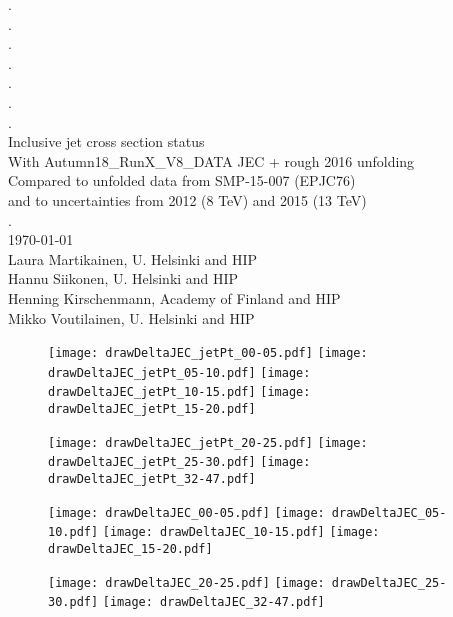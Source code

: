 \documentclass[landscape,10pt]{beamer} %
\begin{document}
\begin{centering}
{. }\\
{. }\\
{. }\\
{. }\\
{. }\\
{. }\\
{. }\\
Inclusive jet cross section status\\
With Autumn18\_RunX\_V8\_DATA JEC + rough 2016 unfolding\\
Compared to unfolded data from SMP-15-007 (EPJC76)\\
and to uncertainties from 2012 (8 TeV) and 2015 (13 TeV)\\
{. }\\
\today\\
Laura Martikainen, U. Helsinki and HIP\\
Hannu Siikonen, U. Helsinki and HIP\\
Henning Kirschenmann, Academy of Finland and HIP\\
Mikko Voutilainen, U. Helsinki and HIP\\
\end{centering}

\newpage

\begin{figure}[p]
\centering
  \texttt{[image: drawDeltaJEC\_jetPt\_00-05.pdf]}
  \texttt{[image: drawDeltaJEC\_jetPt\_05-10.pdf]}
  \texttt{[image: drawDeltaJEC\_jetPt\_10-15.pdf]}
  \texttt{[image: drawDeltaJEC\_jetPt\_15-20.pdf]}
\end{figure}
\begin{figure}[p]
\centering
  \texttt{[image: drawDeltaJEC\_jetPt\_20-25.pdf]}
  \texttt{[image: drawDeltaJEC\_jetPt\_25-30.pdf]}
  \texttt{[image: drawDeltaJEC\_jetPt\_32-47.pdf]}
\end{figure}

\newpage

\begin{figure}[p]
\centering
  \texttt{[image: drawDeltaJEC\_00-05.pdf]}
  \texttt{[image: drawDeltaJEC\_05-10.pdf]}
  \texttt{[image: drawDeltaJEC\_10-15.pdf]}
  \texttt{[image: drawDeltaJEC\_15-20.pdf]}
\end{figure}
\begin{figure}[p]
\centering
  \texttt{[image: drawDeltaJEC\_20-25.pdf]}
  \texttt{[image: drawDeltaJEC\_25-30.pdf]}
  \texttt{[image: drawDeltaJEC\_32-47.pdf]}
\end{figure}
\end{document}
